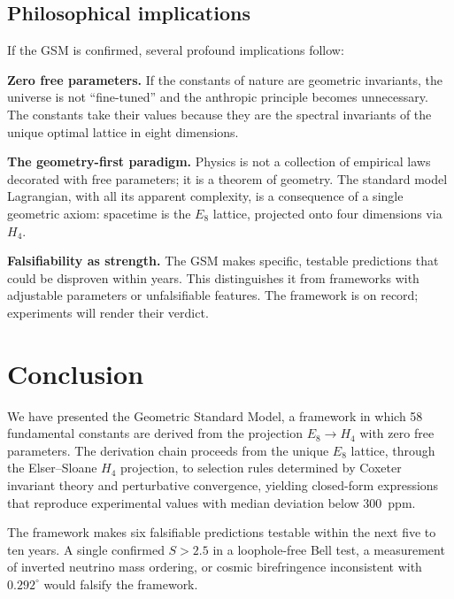 \documentclass[aps,prd,twocolumn,superscriptaddress,nofootinbib,showpacs]{revtex4-2}
\begin{document}
\subsection{Philosophical implications}\label{sec:philosophy}

If the GSM is confirmed, several profound implications follow:

\textbf{Zero free parameters.}  If the constants of nature are
geometric invariants, the universe is not ``fine-tuned'' and the
anthropic principle becomes unnecessary.  The constants take their
values because they are the spectral invariants of the unique optimal
lattice in eight dimensions.

\textbf{The geometry-first paradigm.}  Physics is not a collection of
empirical laws decorated with free parameters; it is a theorem of
geometry.  The standard model Lagrangian, with all its apparent
complexity, is a consequence of a single geometric axiom: spacetime is
the $E_8$ lattice, projected onto four dimensions via $H_4$.

\textbf{Falsifiability as strength.}  The GSM makes specific,
testable predictions that could be disproven within years.  This
distinguishes it from frameworks with adjustable parameters or
unfalsifiable features.  The framework is on record; experiments will
render their verdict.

\section{Conclusion}\label{sec:conclusion}

We have presented the Geometric Standard Model, a framework in which
58 fundamental constants are derived from the projection $E_8 \to H_4$
with zero free parameters.  The derivation chain proceeds from the
unique $E_8$ lattice, through the Elser--Sloane $H_4$ projection,
to selection rules determined by Coxeter invariant theory and
perturbative convergence, yielding closed-form expressions that
reproduce experimental values with median deviation below 300~ppm.

The framework makes six falsifiable predictions testable within the
next five to ten years.  A single confirmed $S > 2.5$ in a
loophole-free Bell test, a measurement of inverted neutrino mass
ordering, or cosmic birefringence inconsistent with $0.292^\circ$ would
falsify the framework.
\end{document}
